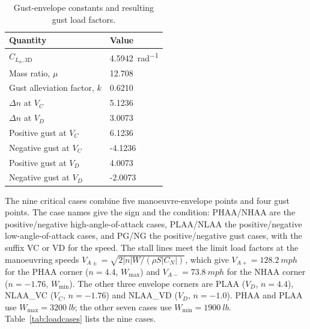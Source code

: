 \documentclass[11pt]{article}
\begin{document}
\begin{table}[H]
\centering
\caption{Gust-envelope constants and resulting gust load factors.}
\label{tab:gustconstants}
\begin{tabular}{ll}
\toprule
Quantity & Value \\
\midrule
$C_{L_\alpha,\mathrm{3D}}$ & \SI{4.5942}{rad^{-1}} \\
Mass ratio, $\mu$ & 12.708 \\
Gust alleviation factor, $k$ & 0.6210 \\
$\Delta n$ at $V_C$ & 5.1236 \\
$\Delta n$ at $V_D$ & 3.0073 \\
Positive gust at $V_C$ & 6.1236 \\
Negative gust at $V_C$ & -4.1236 \\
Positive gust at $V_D$ & 4.0073 \\
Negative gust at $V_D$ & -2.0073 \\
\bottomrule
\end{tabular}
\end{table}

The nine critical cases combine five manoeuvre-envelope points and four gust points. The case names give the sign and the condition: PHAA/NHAA are the positive/negative high-angle-of-attack cases, PLAA/NLAA the positive/negative low-angle-of-attack cases, and PG/NG the positive/negative gust cases, with the suffix VC or VD for the speed. The stall lines meet the limit load factors at the manoeuvring speeds $V_{A\pm}=\sqrt{2|n|W/(\rho S|C_N|)}$, which give $V_{A+}=\SI{128.2}{mph}$ for the PHAA corner ($n=4.4$, $W_{\max}$) and $V_{A-}=\SI{73.8}{mph}$ for the NHAA corner ($n=-1.76$, $W_{\min}$). The other three envelope corners are PLAA ($V_D$, $n=4.4$), NLAA\_VC ($V_C$, $n=-1.76$) and NLAA\_VD ($V_D$, $n=-1.0$). PHAA and PLAA use $W_{\max}=\SI{3200}{lb}$; the other seven cases use $W_{\min}=\SI{1900}{lb}$. Table~\ref{tab:loadcases} lists the nine cases.
\end{document}
